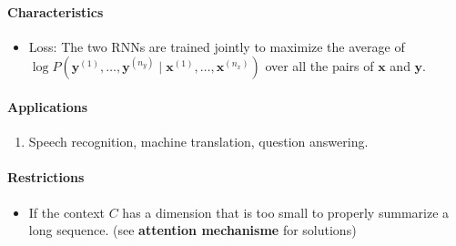 \documentclass[12pt, a4paper]{article}
\def\vx{\boldsymbol{x}}
\def\vy{\boldsymbol{y}}
\newcommand{\egvx}[1]{\boldsymbol{x}^{(#1)}}
\newcommand{\egvy}[1]{\boldsymbol{y}^{(#1)}}
\begin{document}
\paragraph{Characteristics}
\begin{itemize}
    \item{
        Loss: The two RNNs are trained jointly to maximize the average of $\log P(\egvy{1},\dots,\egvy{n_y} \mid \egvx{1},\dots,\egvx{n_x})$ over all the pairs of $\vx$ and $\vy$.
    }
\end{itemize}

\paragraph{Applications}
\begin{enumerate}
    \item Speech recognition, machine translation, question answering.
\end{enumerate}

\paragraph{Restrictions}
\begin{itemize}
    \item If the context $C$ has a dimension that is too small to properly summarize a long sequence. (see \textbf{attention mechanisme} for solutions)
\end{itemize}
\end{document}
